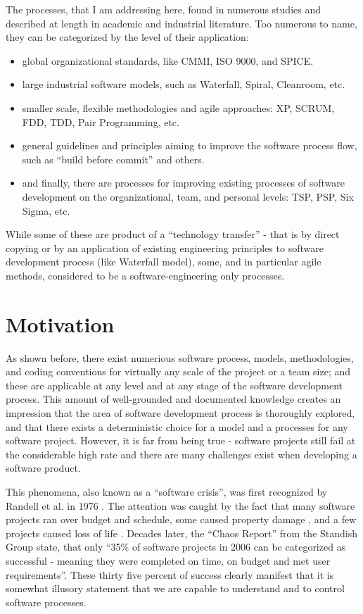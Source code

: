 The processes, that I am addressing here, found in numerous studies and described at length in 
academic and industrial literature. Too numerous to name, they can be categorized by the level 
of their application:
\begin{itemize}
 \item global organizational standards, like CMMI, ISO 9000, and SPICE. 
 \item large industrial software models, such as Waterfall, Spiral, Cleanroom, etc.
 \item smaller scale, flexible methodologies and agile approaches: XP, SCRUM, FDD, 
TDD, Pair Programming, etc.
 \item general guidelines and principles aiming to improve the software process flow, 
such as ``build before commit'' and others.
 \item and finally, there are processes for improving existing processes of software development 
on the organizational, team, and personal levels: TSP, PSP, Six Sigma, etc.
\end{itemize}
While some of these are product of a ``technology transfer'' - that is by direct copying or by an 
application of existing engineering principles to software development process (like Waterfall model), 
some, and in particular agile methods, considered to be a software-engineering only processes. 

\section{Motivation}
As shown before, there exist numerious software process, models, methodologies, 
and coding conventions for virtually any scale of the project or a team size; and these are
applicable at any level and at any stage of the software development process. This amount of 
well-grounded and documented knowledge creates an impression that the area of software development 
process is thoroughly explored, and that there exists a deterministic choice for a model and a 
processes for any software project. However, it is far from being true - software projects still fail 
at the considerable high rate and there are many challenges exist when developing a software product.

This phenomena, also known as a ``software crisis'', was first recognized by Randell et al. in 1976 
\cite{naur1976software}. The attention was caught by the fact that many software projects ran 
over budget and schedule, some caused property damage \cite{citeulike:11044022}, and a few projects caused 
loss of life \cite{citeulike:712058}. Decades later, the ``Chaos Report'' from the Standish 
Group \cite{SDTimes} state, that only ``35\% of software projects in 2006 can 
be categorized as successful - meaning they were completed on time, on budget and met 
user requirements''. These thirty five percent of success clearly manifest that it is somewhat 
illusory statement that we are capable to understand and to control software processes.

